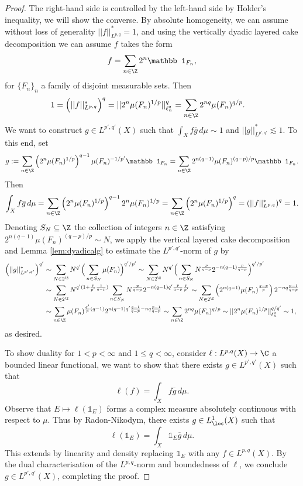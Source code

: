 \documentclass[reqno]{amsart}
\theoremstyle{definition}
\theoremstyle{remark}
\begin{document}
\begin{proof}
	The right-hand side is controlled by the left-hand side by Holder's inequality, we will show the converse. By absolute homogeneity, we can assume without loss of generality $||f||^*_{L^{p, q}} = 1$, and using the vertically dyadic layered cake decomposition we can assume $f$ takes the form
		\[ f = \sum_{n \in \Z} 2^n \mathbb 1_{F_n},  \]
	for $\{F_n\}_n$ a family of disjoint measurable sets. Then 
		\begin{align*}
			1 
				&= \Big( ||f||^*_{L^{p, q}} \Big)^q = ||2^n \mu(F_n)^{1/p} ||^q_{\ell^q_n} = \sum_{n \in \Z} 2^{nq} \mu(F_n)^{q/p}.
		\end{align*}	
	We want to construct $g \in L^{p', q'} (X)$ such that $\int_X f \overline g \, d \mu \sim 1$ and $||g||_{L^{p', q'}}^* \lesssim 1$. To this end, set
		\[ g:= \sum_{n \in \Z} \left(2^{n} \mu (F_n)^{1/p} \right)^{q - 1} \mu(F_n)^{-1/p'} \mathbb 1_{F_n} = \sum_{n \in \Z} 2^{n(q - 1)} \mu(F_n)^{(q - p)/p} \mathbb 1_{F_n}. \]
	Then 
		\[ \int_X f \overline g \, d \mu = \sum_{n \in \Z} \left( 2^n \mu(F_n)^{1/p} \right)^{q - 1} 2^n \mu(F_n)^{1/p} = \sum_{n \in \Z} \left( 2^n \mu(F_n)^{1/p} \right)^q = \left( ||f||_{L^{p, q}}^* \right)^q = 1. \]
	Denoting $S_N \subseteq \Z$ the collection of integers $n \in \Z$ satisfying $2^{n(q - 1)} \mu(F_n)^{(q - p)/p} \sim N$, we apply the vertical layered cake decomposition and Lemma \ref{lem:dyadicalg} to estimate the $L^{p', q'}$-norm of $g$ by 
		\begin{align*}
			 \Big( ||g||_{L^{p', q'}}^* \Big)^{q'} 
			 	&\sim  \sum_{N \in 2^\Z} N^{q'} \Big(\sum_{n \in S_N} \mu(F_n) \Big)^{q'/p'}  \sim \sum_{N \in 2^\Z} N^{q'} \Big(\sum_{n \in S_N} N^{\frac{p}{q - p}} 2^{-n (q - 1) \frac{p}{q - p}}  \Big)^{q'/p'} \\
			 	&\sim \sum_{N \in 2^\Z} N^{q' (1 + \frac{p}{p'} \frac{1}{q - p})} \sum_{n \in S_N} N^{\frac{p}{q - p}} 2^{-n (q - 1) q' \frac{p}{q - p} \frac{p}{p'}}  \sim \sum_{N \in 2^\Z} \left( 2^{n(q - 1)} \mu(F_n)^{\frac{q - p}{p}} \right) 2^{-n q \frac{p - 1}{q - p}} \\
			 	&\sim \sum_{n \in \Z} \mu(F_n)^{\frac{q'}{p} (q - 1)} 2^{n (q - 1) q' \frac{q - 1}{q - p} - nq \frac{p - 1}{q - p}} \sim \sum_{n \in \Z} 2^{nq} \mu(F_n)^{q/p} \sim ||2^n \mu(F_n)^{1/p} ||_{\ell^q_n}^{q/q'} \sim 1,
		\end{align*}	 
	as desired. 
		
	To show duality for $1 < p < \infty$ and $1 \leq q < \infty$, consider $\ell : L^{p, q} (X) \to \C$ a bounded linear functional, we want to show that there exists $g \in L^{p', q'} (X)$ such that 
		\[ \ell (f) = \int_X f \overline g \, d \mu .\]
	Observe that $E \mapsto \ell (\mathbb 1_E)$ forms a complex measure absolutely continuous with respect to $\mu$. Thus by Radon-Nikodym, there exists $g \in L^1_{\loc} (X)$ such that 
		\[ \ell (\mathbb 1_E) = \int_X \mathbb 1_E \overline g \, d\mu. \]
	This extends by linearity and density replacing $\mathbb 1_E$ with any $f \in L^{p, q} (X)$. By the dual characterisation of the $L^{p, q}$-norm and boundedness of $\ell$, we conclude $g \in L^{p', q'} (X)$, completing the proof. 
\end{proof}
\end{document}
